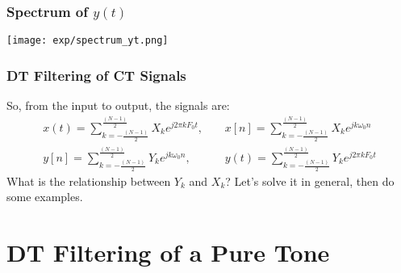 \documentclass{beamer}
\begin{document}
\begin{frame}
  \frametitle{Spectrum of $y(t)$}

  \centerline{\texttt{[image: exp/spectrum\_yt.png]}}
\end{frame}

\begin{frame}
  \frametitle{DT Filtering of CT Signals}

  \begin{center}
  \end{center}
  So, from the input to output, the signals are:
  \begin{align*}
    x(t)=\sum_{k=-\frac{(N-1)}{2}}^{\frac{(N-1)}{2}}X_ke^{j2\pi kF_0t},~~~~~
    &x[n]=\sum_{k=-\frac{(N-1)}{2}}^{\frac{(N-1)}{2}}X_ke^{jk\omega_0n}\\
    y[n]=\sum_{k=-\frac{(N-1)}{2}}^{\frac{(N-1)}{2}}Y_ke^{jk\omega_0n},~~~~~
    &y(t)=\sum_{k=-\frac{(N-1)}{2}}^{\frac{(N-1)}{2}}Y_ke^{j2\pi kF_0t}
  \end{align*}
  What is the relationship between $Y_k$ and $X_k$?  Let's solve it in
  general, then do some examples.
\end{frame}


\section{DT Filtering of a Pure Tone}
\setcounter{subsection}{1}
\end{document}

